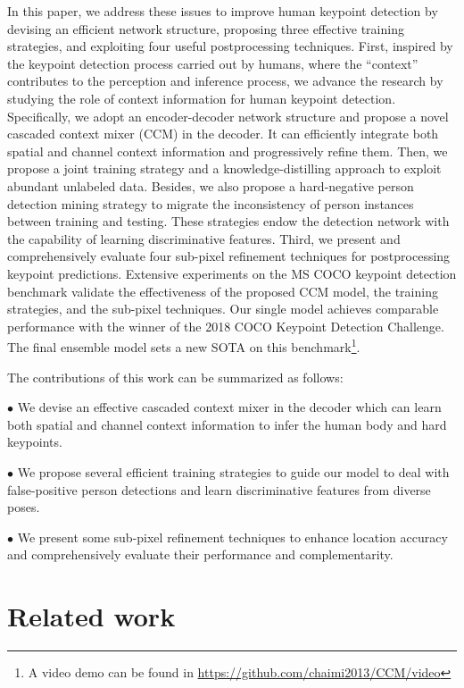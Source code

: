\documentclass[twocolumn]{svjour3}          \smartqed  \usepackage{natbib}
\begin{document}
In this paper, we address these issues to improve human keypoint detection by devising an efficient network structure, proposing three effective training strategies, and exploiting four useful postprocessing techniques. First, inspired by the keypoint detection process carried out by humans, where the ``context'' contributes to the perception and inference process, we advance the research by studying the role of context information for human keypoint detection. Specifically, we adopt an encoder-decoder network structure and propose a novel cascaded context mixer (CCM) in the decoder. It can efficiently integrate both spatial and channel context information and progressively refine them. Then, we propose a joint training strategy and a knowledge-distilling approach to exploit abundant unlabeled data. Besides, we also propose a hard-negative person detection mining strategy to migrate the inconsistency of person instances between training and testing. These strategies endow the detection network with the capability of learning discriminative features. Third, we present and comprehensively evaluate four sub-pixel refinement techniques for postprocessing keypoint predictions. Extensive experiments on the MS COCO keypoint detection benchmark validate the effectiveness of the proposed CCM model, the training strategies, and the sub-pixel techniques. Our single model achieves comparable performance with the winner of the 2018 COCO Keypoint Detection Challenge. The final ensemble model sets a new SOTA on this benchmark\footnote{A video demo can be found in \url{https://github.com/chaimi2013/CCM/video}}.

The contributions of this work can be summarized as follows:

$\bullet$ We devise an effective cascaded context mixer in the decoder which can learn both spatial and channel context information to infer the human body and hard keypoints.

$\bullet$ We propose several efficient training strategies to guide our model to deal with false-positive person detections and learn discriminative features from diverse poses.

$\bullet$ We present some sub-pixel refinement techniques to enhance location accuracy and comprehensively evaluate their performance and complementarity.


\section{Related work}
\label{sec:relatedwork}
\end{document}
